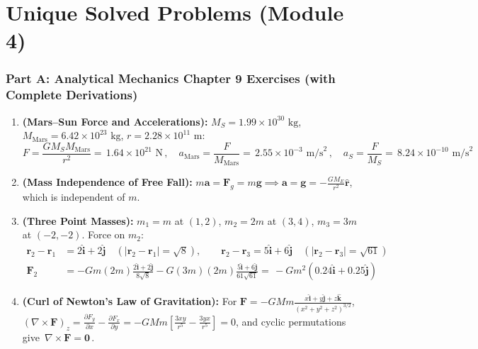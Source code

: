 \documentclass[11pt,a4paper,openany,oneside]{book}
\newcommand{\eqbox}[1]{\boxed{\,#1\,}}
\newcommand{\vect}[1]{\mathbf{#1}}
\newcommand{\uv}[1]{\hat{\mathbf{#1}}}
\newcommand{\ihat}{\hat{\mathbf{i}}}
\newcommand{\jhat}{\hat{\mathbf{j}}}
\newcommand{\khat}{\hat{\mathbf{k}}}
\numberwithin{equation}{chapter}
\begin{document}
\section{Unique Solved Problems (Module 4)}

\subsubsection{Part A: Analytical Mechanics Chapter 9 Exercises (with Complete Derivations)}

\begin{enumerate}[label=\textbf{Ex.\ 9.\arabic*},leftmargin=3.5em]
  \item \textbf{(Mars--Sun Force and Accelerations):} $M_S = 1.99\times 10^{30}\text{ kg}$, $M_{\text{Mars}} = 6.42\times 10^{23}\text{ kg}$, $r = 2.28\times 10^{11}\text{ m}$:
  \begin{equation*}
    F = \frac{GM_S M_{\text{Mars}}}{r^2} = \eqbox{1.64\times 10^{21}\text{ N}}, \quad a_{\text{Mars}} = \frac{F}{M_{\text{Mars}}} = \eqbox{2.55\times 10^{-3}\text{ m/s}^2}, \quad a_S = \frac{F}{M_S} = \eqbox{8.24\times 10^{-10}\text{ m/s}^2}
  \end{equation*}

  \item \textbf{(Mass Independence of Free Fall):} $m\vect{a} = \vect{F}_g = m\vect{g} \implies \vect{a} = \vect{g} = -\frac{GM_E}{r^2}\uv{r}$, which is independent of $m$.

  \item \textbf{(Three Point Masses):} $m_1 = m$ at $(1,2)$, $m_2 = 2m$ at $(3,4)$, $m_3 = 3m$ at $(-2,-2)$. Force on $m_2$:
  \begin{align*}
    \vect{r}_2 - \vect{r}_1 &= 2\ihat + 2\jhat \quad(|\vect{r}_2-\vect{r}_1| = \sqrt{8}), \qquad \vect{r}_2 - \vect{r}_3 = 5\ihat + 6\jhat \quad(|\vect{r}_2-\vect{r}_3| = \sqrt{61})\\
    \vect{F}_2 &= -Gm(2m)\frac{2\ihat+2\jhat}{8\sqrt{8}} - G(3m)(2m)\frac{5\ihat+6\jhat}{61\sqrt{61}} = \eqbox{-Gm^2(0.24\ihat + 0.25\jhat)}
  \end{align*}

  \item \textbf{(Curl of Newton's Law of Gravitation):} For $\vect{F} = -GMm\frac{x\ihat+y\jhat+z\khat}{(x^2+y^2+z^2)^{3/2}}$, $(\nabla\times\vect{F})_z = \frac{\partial F_y}{\partial x} - \frac{\partial F_x}{\partial y} = -GMm\!\left[\frac{3xy}{r^5} - \frac{3yx}{r^5}\right] = 0$, and cyclic permutations give $\eqbox{\nabla\times\vect{F} = \vect{0}}$.


\end{enumerate}
\end{document}
